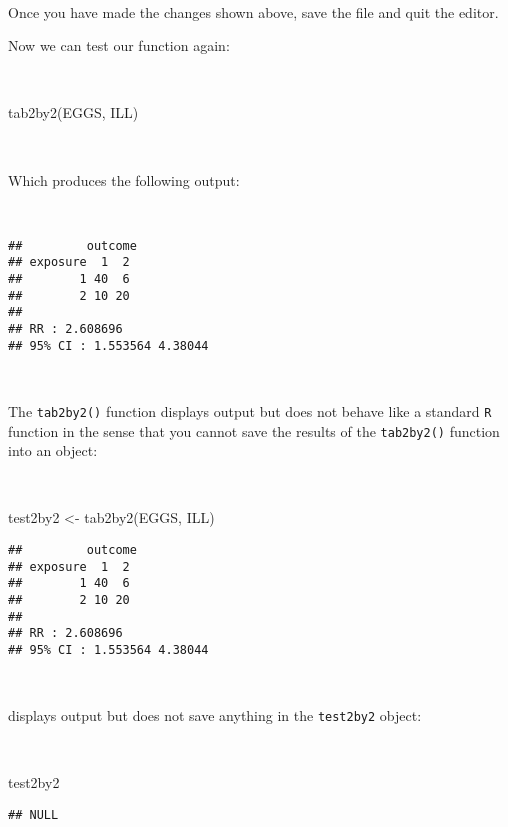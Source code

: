 \documentclass[
  12pt,
  a4paper]{book}
\newenvironment{Shaded}{\begin{snugshade}}{\end{snugshade}}
\newcommand{\FunctionTok}[1]{\textcolor[rgb]{0.00,0.00,0.00}{#1}}
\newcommand{\NormalTok}[1]{#1}
\newcommand{\OtherTok}[1]{\textcolor[rgb]{0.56,0.35,0.01}{#1}}
\begin{document}
~

Once you have made the changes shown above, save the file and quit the editor.

\newpage

Now we can test our function again:

~

\begin{Shaded}
\begin{Highlighting}[]
\FunctionTok{tab2by2}\NormalTok{(EGGS, ILL)}
\end{Highlighting}
\end{Shaded}

~

Which produces the following output:

~

\begin{verbatim}
##         outcome
## exposure  1  2
##        1 40  6
##        2 10 20
## 
## RR : 2.608696 
## 95% CI : 1.553564 4.38044
\end{verbatim}

~

The \texttt{tab2by2()} function displays output but does not behave like a standard \texttt{R} function in the sense that you cannot save the results of the \texttt{tab2by2()} function into an object:

~

\begin{Shaded}
\begin{Highlighting}[]
\NormalTok{test2by2 }\OtherTok{\textless{}{-}} \FunctionTok{tab2by2}\NormalTok{(EGGS, ILL)}
\end{Highlighting}
\end{Shaded}

\begin{verbatim}
##         outcome
## exposure  1  2
##        1 40  6
##        2 10 20
## 
## RR : 2.608696 
## 95% CI : 1.553564 4.38044
\end{verbatim}

~

displays output but does not save anything in the \texttt{test2by2} object:

~

\begin{Shaded}
\begin{Highlighting}[]
\NormalTok{test2by2}
\end{Highlighting}
\end{Shaded}

\begin{verbatim}
## NULL
\end{verbatim}
\end{document}
